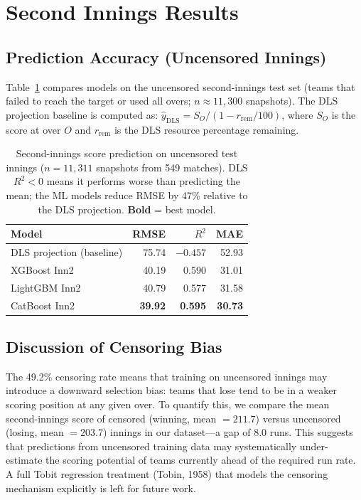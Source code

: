 \documentclass[12pt,a4paper,oneside]{report}
\begin{document}
\section{Second Innings Results}
\label{sec:inn2_results}

\subsection{Prediction Accuracy (Uncensored Innings)}

Table~\ref{tab:inn2_results} compares models on the uncensored second-innings test set (teams that failed to reach the target or used all overs; $n \approx 11{,}300$ snapshots).  The DLS projection baseline is computed as: $\hat{y}_\text{DLS} = S_O / (1 - r_\text{rem}/100)$, where $S_O$ is the score at over $O$ and $r_\text{rem}$ is the DLS resource percentage remaining.

\begin{table}[htbp]
\centering
\caption[Second-innings score prediction on uncensored innings]{Second-innings score prediction on uncensored test innings ($n = 11{,}311$ snapshots from 549 matches).  DLS $R^2 < 0$ means it performs worse than predicting the mean; the ML models reduce RMSE by 47\% relative to the DLS projection.  \textbf{Bold} = best model.}
\label{tab:inn2_results}
\small
\begin{tabular}{lrrr}
\toprule
\textbf{Model} & \textbf{RMSE} & $R^2$ & \textbf{MAE} \\
\midrule
DLS projection (baseline) & 75.74 & $-0.457$ & 52.93 \\
\midrule
XGBoost Inn2              & 40.19 & 0.590 & 31.01 \\
LightGBM Inn2             & 40.79 & 0.577 & 31.58 \\
CatBoost Inn2             & \textbf{39.92} & \textbf{0.595} & \textbf{30.73} \\
\bottomrule
\end{tabular}
\end{table}

\subsection{Discussion of Censoring Bias}

The 49.2\% censoring rate means that training on uncensored innings may introduce a downward selection bias: teams that lose tend to be in a weaker scoring position at any given over.  To quantify this, we compare the mean second-innings score of censored (winning, mean $= 211.7$) versus uncensored (losing, mean $= 203.7$) innings in our dataset---a gap of 8.0 runs.  This suggests that predictions from uncensored training data may systematically under-estimate the scoring potential of teams currently ahead of the required run rate.  A full Tobit regression treatment (Tobin, 1958) that models the censoring mechanism explicitly is left for future work.
\end{document}
